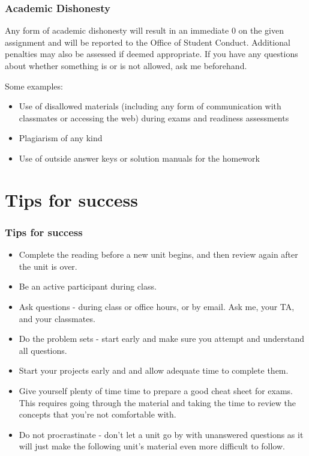 \documentclass[slidestop,compress,mathserif,12pt,t,professionalfonts,xcolor=table]{beamer}
\begin{document}

\begin{frame}
\frametitle{Academic Dishonesty}

Any form of academic dishonesty will result in an immediate 0 on the given assignment and will be reported to the Office of Student Conduct. Additional penalties may also be assessed if deemed appropriate. If you have any questions about whether something is or is not allowed, ask me beforehand.

Some examples:

\begin{itemize}

\item Use of disallowed materials (including any form of communication with classmates or accessing the web) during exams and readiness assessments

\item Plagiarism of any kind

\item Use of outside answer keys or solution manuals for the homework

\end{itemize}

\end{frame}


\section{Tips for success}


\begin{frame}
\frametitle{Tips for success}

{\footnotesize
\begin{itemize}[<alert@+>]
\item Complete the reading before a new unit begins, and then review again after the unit is over.
\item Be an active participant during class.
\item Ask questions - during class or office hours, or by email. Ask me, your TA, and your classmates.
\item Do the problem sets - start early and make sure you attempt and understand all questions.
\item Start your projects early and and allow adequate time to complete them.
\item Give yourself plenty of time time to prepare a good cheat sheet for exams. This requires going through the material and taking the time to review the concepts that you're not comfortable with.
\item Do not procrastinate - don't let a unit go by with unanswered questions as it will just make the following unit's material even more difficult to follow. 
\end{itemize}
}

\end{frame}

\end{document}
